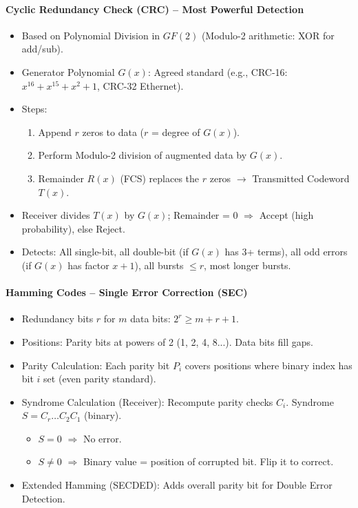 \documentclass[11pt]{article}
\newcommand{\cle}[1]{{\popxbold\color{popdark}#1}}
\begin{document}
\begin{bilan}
\paragraph{Cyclic Redundancy Check (CRC) -- Most Powerful Detection}
\begin{itemize}
    \item Based on \cle{Polynomial Division} in $GF(2)$ (Modulo-2 arithmetic: XOR for add/sub).
    \item \cle{Generator Polynomial $G(x)$}: Agreed standard (e.g., CRC-16: $x^{16}+x^{15}+x^2+1$, CRC-32 Ethernet).
    \item \cle{Steps}:
        \begin{enumerate}
            \item Append $r$ zeros to data ($r$ = degree of $G(x)$).
            \item Perform Modulo-2 division of augmented data by $G(x)$.
            \item \cle{Remainder $R(x)$ (FCS)} replaces the $r$ zeros $\rightarrow$ Transmitted Codeword $T(x)$.
        \end{enumerate}
    \item Receiver divides $T(x)$ by $G(x)$; \cle{Remainder = 0} $\Rightarrow$ Accept (high probability), else Reject.
    \item Detects: All single-bit, all double-bit (if $G(x)$ has 3+ terms), all odd errors (if $G(x)$ has factor $x+1$), all bursts $\le r$, most longer bursts.
\end{itemize}

\paragraph{Hamming Codes -- Single Error Correction (SEC)}
\begin{itemize}
    \item \cle{Redundancy bits $r$} for $m$ data bits: $2^r \ge m + r + 1$.
    \item \cle{Positions}: Parity bits at powers of 2 (1, 2, 4, 8...). Data bits fill gaps.
    \item \cle{Parity Calculation}: Each parity bit $P_i$ covers positions where binary index has bit $i$ set (even parity standard).
    \item \cle{Syndrome Calculation} (Receiver): Recompute parity checks $C_i$. Syndrome $S = C_r \dots C_2 C_1$ (binary).
        \begin{itemize}
            \item $S = 0$ $\Rightarrow$ No error.
            \item $S \neq 0$ $\Rightarrow$ Binary value = position of corrupted bit. Flip it to correct.
        \end{itemize}
    \item Extended Hamming (SECDED): Adds overall parity bit for Double Error Detection.
\end{itemize}


\end{bilan}
\end{document}
